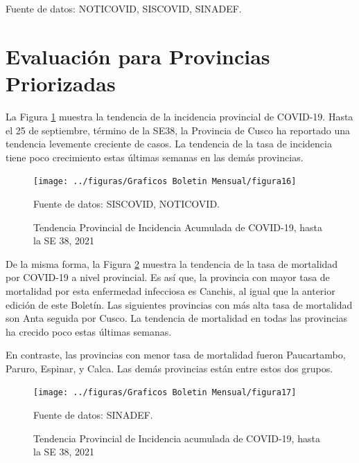 \documentclass[12pt,a4paper,openany]{book}
\begin{document}
	
	{\footnotesize Fuente de datos: NOTICOVID, SISCOVID, SINADEF.}

	\chapter*{Evaluación para Provincias Priorizadas}
	\noindent La Figura \ref{fig:incidencia_provincias} muestra la tendencia de la incidencia provincial de COVID-19. Hasta el 25 de septiembre, término de la SE38, la Provincia de Cusco ha reportado una tendencia levemente creciente de casos. La tendencia de la tasa de incidencia tiene poco crecimiento estas últimas semanas en las demás provincias.
	
	\begin{figure}[h]
		\caption{Tendencia Provincial de Incidencia Acumulada de COVID-19, hasta la SE 38, 2021}\label{fig:incidencia_provincias}
		\begin{center}
			\texttt{[image: ../figuras/Graficos Boletin Mensual/figura16]}
		\end{center}
		{\footnotesize {Fuente de datos: SISCOVID, NOTICOVID.}}
	\end{figure}
	
	De la misma forma, la Figura \ref{fig:mortalidad_provincias} muestra la tendencia de la tasa de mortalidad por COVID-19 a nivel provincial. Es así que, la provincia con mayor tasa de mortalidad por esta enfermedad infecciosa es Canchis, al igual que la anterior edición de este Boletín. Las siguientes provincias con más alta tasa de mortalidad son Anta seguida por Cusco. La tendencia de mortalidad en todas las provincias ha crecido poco estas últimas semanas.
	
	En contraste, las provincias con menor tasa de mortalidad fueron Paucartambo, Paruro, Espinar, y Calca. Las demás provincias están entre estos dos grupos.
	
	\begin{figure}[h]
		\caption{Tendencia Provincial de Incidencia acumulada de COVID-19, hasta la SE 38, 2021}\label{fig:mortalidad_provincias}
		\begin{center}
			\texttt{[image: ../figuras/Graficos Boletin Mensual/figura17]}
		\end{center}
		{\footnotesize {Fuente de datos: SINADEF.}}
	\end{figure}
	
\end{document}
